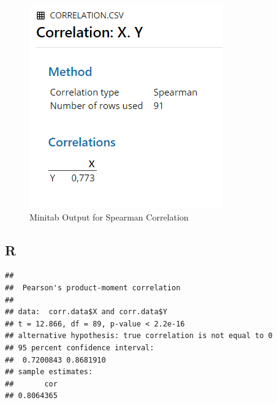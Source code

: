 \documentclass[
]{book}
\newenvironment{Shaded}{\begin{snugshade}}{\end{snugshade}}
\newcommand{\DataTypeTok}[1]{\textcolor[rgb]{0.13,0.29,0.53}{#1}}
\newcommand{\KeywordTok}[1]{\textcolor[rgb]{0.13,0.29,0.53}{\textbf{#1}}}
\newcommand{\NormalTok}[1]{#1}
\newcommand{\OperatorTok}[1]{\textcolor[rgb]{0.81,0.36,0.00}{\textbf{#1}}}
\newcommand{\StringTok}[1]{\textcolor[rgb]{0.31,0.60,0.02}{#1}}
\begin{document}
\begin{figure}[!h]
\includegraphics{Screenshots/Correlation/corrMinitab2} \caption{\label{fig:corrMinitab2}Minitab Output for Spearman Correlation}\label{fig:corrMinitab2}
\end{figure}

\hypertarget{r}{%
\subsection{R}\label{r}}

\begin{Shaded}
\end{Shaded}

\begin{verbatim}
## 
## 	Pearson's product-moment correlation
## 
## data:  corr.data$X and corr.data$Y
## t = 12.866, df = 89, p-value < 2.2e-16
## alternative hypothesis: true correlation is not equal to 0
## 95 percent confidence interval:
##  0.7200843 0.8681910
## sample estimates:
##       cor 
## 0.8064365
\end{verbatim}

\begin{Shaded}
\end{Shaded}
\end{document}
